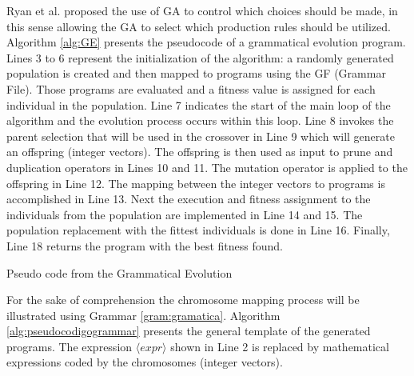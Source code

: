 \documentclass[conference]{IEEEtran}
\begin{document}
	Ryan et al. \cite{ryan1998grammatical}  proposed the use of GA to control which choices should be made, in this sense allowing the GA to select which production rules should be utilized. Algorithm \ref{alg:GE} presents the pseudocode of a grammatical evolution program. Lines 3 to 6 represent the initialization of the algorithm: a randomly generated population is created and then mapped to programs using the GF (Grammar File). Those programs are evaluated and a fitness value is assigned for each individual in the population. Line 7 indicates the start of the main loop of the algorithm and the evolution process occurs within this loop. Line 8 invokes the parent selection that will be used in the crossover in Line 9 which will generate an offspring (integer vectors). The offspring is then used as input to prune and duplication operators in Lines 10 and 11. The mutation operator is applied to the offspring in Line 12. The mapping between the integer vectors to programs is accomplished in Line 13. Next the execution and fitness assignment to the individuals from the population are implemented in Line 14 and 15. The population replacement with the fittest individuals is done in Line 16. Finally, Line 18 returns the program with the best fitness found.
 
\begin{algorithm}[htb]
	\fontsize{8pt}{10pt}\selectfont
	\caption{Pseudo code from the Grammatical Evolution}
	\label{alg:GE}
\end{algorithm}


For the sake of comprehension the chromosome mapping process will be illustrated using Grammar \ref{gram:gramatica}. Algorithm \ref{alg:pseudocodigogrammar} presents the general template of the generated programs. The expression $\langle expr \rangle$ shown in Line 2 is replaced by mathematical expressions coded by the chromosomes (integer vectors).
\end{document}
